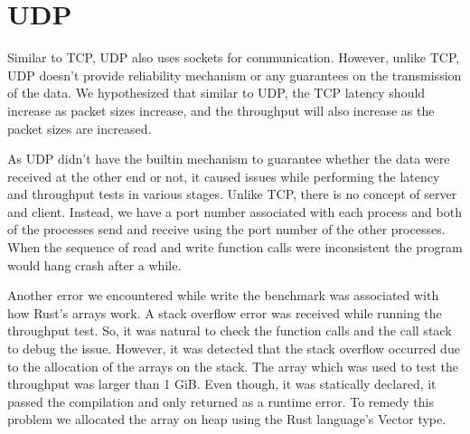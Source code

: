 \section{UDP}

Similar to TCP, UDP also uses sockets for communication. However, unlike TCP, UDP doesn't provide reliability mechanism or any guarantees on the transmission of the data. We hypothesized that similar to UDP, the TCP latency should increase as packet sizes increase, and the throughput will also increase as the packet sizes are increased.

As UDP didn't have the builtin mechanism to guarantee whether the data were received at the other end or not, it caused issues while performing the latency and throughput tests in various stages. Unlike TCP, there is no concept of server and client. Instead, we have a port number associated with each process and both of the processes send and receive using the port number of the other processes. When the sequence of read and write function calls were inconsistent the program would hang crash after a while.  

Another error we encountered while write the benchmark was associated with how Rust's arrays work. A stack overflow error was received while running the throughput test. So, it was natural to check the function calls and the call stack to debug the issue. However, it was detected that the stack overflow occurred due to the allocation of the arrays on the stack. The array which was used to test the throughput was larger than 1 GiB. Even though, it was statically declared, it passed the compilation and only returned as a runtime error. To remedy this problem we allocated the array on heap using the Rust language's Vector type.



